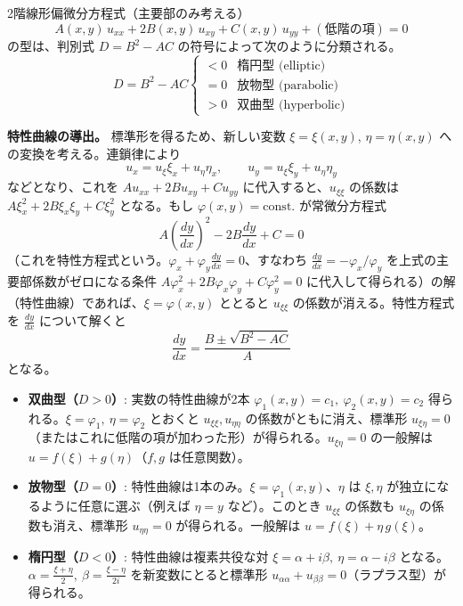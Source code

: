 \documentclass[a4paper,11pt]{article}
\begin{document}


\noindent
2階線形偏微分方程式（主要部のみ考える）
\[
A(x,y)\,u_{xx} + 2B(x,y)\,u_{xy} + C(x,y)\,u_{yy} + (\text{低階の項}) = 0
\]
の型は、判別式 $D = B^{2} - AC$ の符号によって次のように分類される。
\[
D = B^{2}-AC
\begin{cases}
< 0 & \text{楕円型 (elliptic)}\\
= 0 & \text{放物型 (parabolic)}\\
> 0 & \text{双曲型 (hyperbolic)}
\end{cases}
\]

\medskip
\noindent
\textbf{特性曲線の導出。} 標準形を得るため、新しい変数 $\xi = \xi(x,y)$, $\eta = \eta(x,y)$ への変換を考える。連鎖律により
\[
u_x = u_\xi \xi_x + u_\eta \eta_x, \qquad
u_y = u_\xi \xi_y + u_\eta \eta_y
\]
などとなり、これを $Au_{xx}+2Bu_{xy}+Cu_{yy}$ に代入すると、$u_{\xi\xi}$ の係数は $A\xi_x^2+2B\xi_x\xi_y+C\xi_y^2$ となる。もし $\varphi(x,y)=\mathrm{const.}$ が常微分方程式
\[
A\left(\frac{dy}{dx}\right)^{2} - 2B\frac{dy}{dx} + C = 0
\]
（これを特性方程式という。$\varphi_x + \varphi_y \frac{dy}{dx}=0$、すなわち $\frac{dy}{dx} = -\varphi_x/\varphi_y$ を上式の主要部係数がゼロになる条件 $A\varphi_x^2+2B\varphi_x\varphi_y+C\varphi_y^2=0$ に代入して得られる）の解（特性曲線）であれば、$\xi=\varphi(x,y)$ ととると $u_{\xi\xi}$ の係数が消える。特性方程式を $\frac{dy}{dx}$ について解くと
\[
\frac{dy}{dx} = \frac{B \pm \sqrt{B^{2}-AC}}{A}
\]
となる。
\begin{itemize}
\item \textbf{双曲型（$D>0$）}: 実数の特性曲線が2本 $\varphi_1(x,y)=c_1,\ \varphi_2(x,y)=c_2$ 得られる。$\xi=\varphi_1,\ \eta=\varphi_2$ とおくと $u_{\xi\xi}, u_{\eta\eta}$ の係数がともに消え、標準形 $u_{\xi\eta}=0$（またはこれに低階の項が加わった形）が得られる。$u_{\xi\eta}=0$ の一般解は $u=f(\xi)+g(\eta)$（$f,g$ は任意関数）。
\item \textbf{放物型（$D=0$）}: 特性曲線は1本のみ。$\xi=\varphi_1(x,y)$、$\eta$ は $\xi,\eta$ が独立になるように任意に選ぶ（例えば $\eta=y$ など）。このとき $u_{\xi\xi}$ の係数も $u_{\xi\eta}$ の係数も消え、標準形 $u_{\eta\eta}=0$ が得られる。一般解は $u=f(\xi)+\eta\,g(\xi)$。
\item \textbf{楕円型（$D<0$）}: 特性曲線は複素共役な対 $\xi=\alpha+i\beta,\ \eta=\alpha-i\beta$ となる。$\alpha=\frac{\xi+\eta}{2},\ \beta=\frac{\xi-\eta}{2i}$ を新変数にとると標準形 $u_{\alpha\alpha}+u_{\beta\beta}=0$（ラプラス型）が得られる。
\end{itemize}
\end{document}
